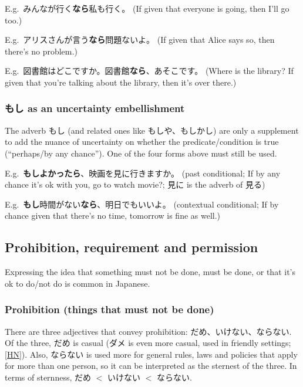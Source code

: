 \documentclass[../nihongo-gakushuu-kyouzai.tex]{subfiles}
\begin{document}
E.g.\ みんなが行く\textbf{なら\textlightgrey{[ば]}}私も行く。 (If given that everyone is going, then I'll go too.)

E.g.\ アリスさんが言う\textbf{なら\textlightgrey{[ば]}}問題ないよ。 (If given that Alice says so, then there's no problem.)

E.g.\ 図書館はどこですか。図書館\textbf{なら\textlightgrey{[ば]}}、あそこです。 (Where is the library? If given that you're talking about the library, then it's over there.)

\subsubsection{もし as an uncertainty embellishment} \label{sec:moshi-as-uncertainty-embellishment}
The adverb もし (and related ones like もしや、もしかし) are only a supplement to add the nuance of uncertainty on whether the predicate/condition is true (``perhaps/by any chance''). One of the four forms above must still be used.

E.g.\ \textbf{もし}\textbf{よかったら}、映画を見に行きますか。 (past conditional; If by any chance it's ok with you, go to watch movie?; 見に is the adverb of 見る)

E.g.\ \textbf{もし}時間がない\textbf{なら}、明日でもいいよ。 (contextual conditional; If by chance given that there's no time, tomorrow is fine as well.)

\subsection{Prohibition, requirement and permission} \label{sec:prohibition-requirement-and-permission}
Expressing the idea that something must not be done, must be done, or that it's ok to do/not do is common in Japanese.

\subsubsection{Prohibition (things that must not be done)} \label{sec:prohibition}
There are three adjectives that convey prohibition: だめ、いけない、ならない. Of the three, だめ is casual (ダメ is even more casual, used in friendly settings; \href{https://ja.hinative.com/questions/19206672}{[HN]}). Also, ならない is used more for general rules, laws and policies that apply for more than one person, so it can be interpreted as the sternest of the three. In terms of sternness, だめ $<$ いけない $<$ ならない.
\end{document}
